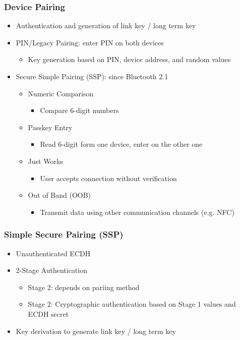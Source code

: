 \subsubsection{Device Pairing}
\begin{itemize}
  \item Authentication and generation of link key / long term key
  \item PIN/Legacy Pairing: enter PIN on both devices 
    \begin{itemize}
      \item Key generation based on PIN, device address, and random values
    \end{itemize}
  \item Secure Simple Pairing (SSP): since Bluetooth 2.1 
    \begin{itemize}
      \item Numeric Comparison
        \begin{itemize}
          \item Compare 6-digit numbers
        \end{itemize}
      \item Passkey Entry 
        \begin{itemize}
          \item Read 6-digit form one device, enter on the other one
        \end{itemize}
      \item Just Works 
        \begin{itemize}
          \item User accepts connection without verification
        \end{itemize}
      \item Out of Band (OOB) 
        \begin{itemize}
          \item Transmit data using other communication channels (e.g. NFC)
        \end{itemize}
    \end{itemize}
\end{itemize}

\subsubsection{Simple Secure Pairing (SSP)}
\begin{itemize}
  \item Unauthenticated ECDH
  \item 2-Stage Authentication 
    \begin{itemize}
      \item Stage 2: depends on pariing method
      \item Stage 2: Cryptographic authentication based on Stage 1 values and ECDH secret 
    \end{itemize}
  \item Key derivation to generate link key / long term key 
\end{itemize}

